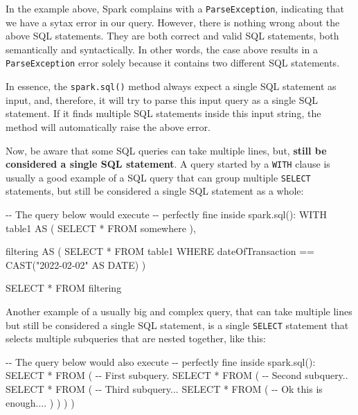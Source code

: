 \documentclass[
  11pt,
  letterpaper,
  DIV=11,
  numbers=noendperiod]{scrreprt}
\newenvironment{Shaded}{\begin{snugshade}}{\end{snugshade}}
\newcommand{\CommentTok}[1]{\textcolor[rgb]{0.37,0.37,0.37}{#1}}
\newcommand{\DataTypeTok}[1]{\textcolor[rgb]{0.68,0.00,0.00}{#1}}
\newcommand{\FunctionTok}[1]{\textcolor[rgb]{0.28,0.35,0.67}{#1}}
\newcommand{\KeywordTok}[1]{\textcolor[rgb]{0.00,0.23,0.31}{#1}}
\newcommand{\NormalTok}[1]{\textcolor[rgb]{0.00,0.23,0.31}{#1}}
\newcommand{\OperatorTok}[1]{\textcolor[rgb]{0.37,0.37,0.37}{#1}}
\newcommand{\OtherTok}[1]{\textcolor[rgb]{0.00,0.23,0.31}{#1}}
\begin{document}
In the example above, Spark complains with a \texttt{ParseException},
indicating that we have a sytax error in our query. However, there is
nothing wrong about the above SQL statements. They are both correct and
valid SQL statements, both semantically and syntactically. In other
words, the case above results in a \texttt{ParseException} error solely
because it contains two different SQL statements.

In essence, the \texttt{spark.sql()} method always expect a single SQL
statement as input, and, therefore, it will try to parse this input
query as a single SQL statement. If it finds multiple SQL statements
inside this input string, the method will automatically raise the above
error.

Now, be aware that some SQL queries can take multiple lines, but,
\textbf{still be considered a single SQL statement}. A query started by
a \texttt{WITH} clause is usually a good example of a SQL query that can
group multiple \texttt{SELECT} statements, but still be considered a
single SQL statement as a whole:

\begin{Shaded}
\begin{Highlighting}[]
\CommentTok{{-}{-} The query below would execute}
\CommentTok{{-}{-} perfectly fine inside spark.sql():}
\KeywordTok{WITH}\NormalTok{ table1 }\KeywordTok{AS}\NormalTok{ (}
  \KeywordTok{SELECT} \OperatorTok{*}
  \KeywordTok{FROM}\NormalTok{ somewhere}
\NormalTok{),}

\NormalTok{filtering }\KeywordTok{AS}\NormalTok{ (}
  \KeywordTok{SELECT} \OperatorTok{*}
  \KeywordTok{FROM}\NormalTok{ table1}
  \KeywordTok{WHERE}\NormalTok{ dateOfTransaction }\OperatorTok{==} \FunctionTok{CAST}\NormalTok{(}\OtherTok{"2022{-}02{-}02"} \KeywordTok{AS} \DataTypeTok{DATE}\NormalTok{)}
\NormalTok{)}

\KeywordTok{SELECT} \OperatorTok{*}
\KeywordTok{FROM}\NormalTok{ filtering}
\end{Highlighting}
\end{Shaded}

Another example of a usually big and complex query, that can take
multiple lines but still be considered a single SQL statement, is a
single \texttt{SELECT} statement that selects multiple subqueries that
are nested together, like this:

\begin{Shaded}
\begin{Highlighting}[]
\CommentTok{{-}{-} The query below would also execute}
\CommentTok{{-}{-} perfectly fine inside spark.sql():}
\KeywordTok{SELECT} \OperatorTok{*}
\KeywordTok{FROM}\NormalTok{ (}
  \CommentTok{{-}{-} First subquery.}
  \KeywordTok{SELECT} \OperatorTok{*}
  \KeywordTok{FROM}\NormalTok{ (}
    \CommentTok{{-}{-} Second subquery..}
    \KeywordTok{SELECT} \OperatorTok{*}
    \KeywordTok{FROM}\NormalTok{ (}
      \CommentTok{{-}{-} Third subquery...}
      \KeywordTok{SELECT} \OperatorTok{*}
      \KeywordTok{FROM}\NormalTok{ (}
        \CommentTok{{-}{-} Ok this is enough....}
\NormalTok{      )}
\NormalTok{    )}
\NormalTok{  )}
\NormalTok{)}
\end{Highlighting}
\end{Shaded}
\end{document}
